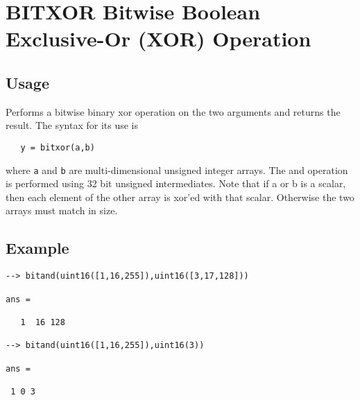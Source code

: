 \section{BITXOR Bitwise Boolean Exclusive-Or (XOR) Operation}

\subsection{Usage}

Performs a bitwise binary xor operation on the two arguments and
returns the result.  The syntax for its use is
\begin{verbatim}
   y = bitxor(a,b)
\end{verbatim}
where \verb|a| and \verb|b| are multi-dimensional unsigned integer arrays.
The and operation is performed using 32 bit unsigned intermediates.  Note that if a
or b is a scalar, then each element of the other array is xor'ed with
 that scalar.  Otherwise the two arrays must match in size.
\subsection{Example}

\begin{verbatim}
--> bitand(uint16([1,16,255]),uint16([3,17,128]))

ans = 

   1  16 128 

--> bitand(uint16([1,16,255]),uint16(3))

ans = 

 1 0 3 
\end{verbatim}
